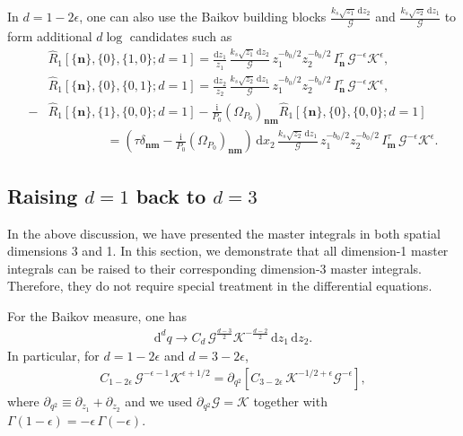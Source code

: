 \documentclass[a4paper]{article}
\newcommand{\n}{\nonumber}
\def\di{{\mathrm{d}}}
\def\ii{\mathrm{i}}
\def\ep{\epsilon}
\newcommand{\mG}{\mathcal{G}}
\newcommand{\mK}{\mathcal{K}}
\def\to{\rightarrow}
\begin{document}
In $d=1-2\ep$, one can also use the Baikov building blocks
$\frac{k_s\sqrt{z_1}\,\di z_2}{\mG}$ and $\frac{k_s\sqrt{z_2}\,\di z_1}{\mG}$ to form additional $d\log$ candidates such as
\begin{align}
	&\hat{R}_1[\{\bm n\},\{0\},\{1,0\};d=1]
	= \frac{\di z_1}{z_1}\,\frac{k_s\sqrt{z_1}\,\di z_2}{\mG}\,
	z_1^{-b_0/2}z_2^{-b_0/2}\,I^{\tau}_{\bm n}\,\mG^{-\ep}\mK^{\ep}, \n \\
	&\hat{R}_1[\{\bm n\},\{0\},\{0,1\};d=1]
	= \frac{\di z_2}{z_2}\,\frac{k_s\sqrt{z_2}\,\di z_1}{\mG}\,
	z_1^{-b_0/2}z_2^{-b_0/2}\,I^{\tau}_{\bm n}\,\mG^{-\ep}\mK^{\ep},  \n \\
	-&\hat{R}_1[\{\bm{n}\},\{1\},\{0,0\};d=1]-  \frac{\ii}{P_0} (\Omega_{P_0})_{\bm n\bm m} \hat{R}_1[\{\bm{n}\},\{0\},\{0,0\};d=1]   \n\\                       &~~~~~~~~~~~~~~~~~~~~~= \left(\tau\delta_{\bm n\bm m} - 	 \frac{\ii}{P_0}(\Omega_{P_0})_{\bm n\bm m}\right)\,\di x_2\,\frac{k_s\sqrt{z_2}\,\di z_1}{\mG}\,
	z_1^{-b_0/2}z_2^{-b_0/2}\,I^{\tau}_{\bm m}\,\mG^{-\ep}\mK^{\ep}.
\end{align}

\subsection{Raising $d=1$ back to $d=3$}
In the above discussion, we have presented the master integrals in both spatial dimensions 3 and 1. In this section, we demonstrate that all dimension-1 master integrals can be raised to their corresponding dimension-3 master integrals. Therefore, they do not require special treatment in the differential equations. 

For the Baikov measure, one has
\begin{align}
	\di^d q \to C_d\,\mG^{\frac{d-3}{2}}\mK^{-\frac{d-2}{2}}\,\di z_1\,\di z_2.
\end{align}
In particular, for $d=1-2\ep$ and $d=3-2\ep$,
\begin{align}
	C_{1-2\ep}\,\mG^{-\ep-1}\mK^{\ep+1/2}
	= \partial_{q^2}\!\left[C_{3-2\ep}\,\mK^{-1/2+\ep}\mG^{-\ep}\right],
\end{align}
where $\partial_{q^2}\equiv\partial_{z_1}+\partial_{z_2}$ and we used $\partial_{q^2}\mG=\mK$ together with $\Gamma(1-\ep)=-\ep\,\Gamma(-\ep)$.
\end{document}
